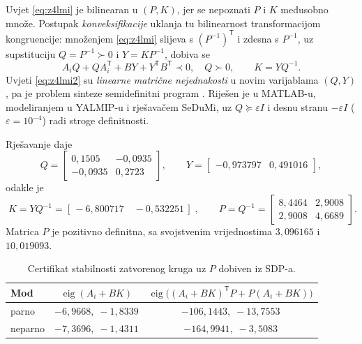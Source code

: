 Uvjet \eqref{eq:z4lmi} je bilinearan u $(P,K)$, jer se nepoznati $P$ i $K$
međusobno množe. Postupak \emph{konveksifikacije} \cite[str.~32]{jokic_ljapunov}
uklanja tu bilinearnost transformacijom kongruencije: množenjem
\eqref{eq:z4lmi} slijeva s $(P^{-1})^{\mathsf T}$ i zdesna s $P^{-1}$, uz
supstituciju $Q = P^{-1} \succ 0$ i $Y = KP^{-1}$, dobiva se
\begin{equation}
  A_iQ + QA_i^{\mathsf T} + BY + Y^{\mathsf T}B^{\mathsf T} \prec 0, \quad Q \succ 0,
  \qquad K = YQ^{-1} .
  \label{eq:z4lmi2}
\end{equation}
Uvjeti \eqref{eq:z4lmi2} su \emph{linearne matrične nejednakosti} u novim
varijablama $(Q,Y)$, pa je problem sinteze semidefinitni program
\cite[str.~23]{jokic_qcpsdp}. Riješen je u MATLAB-u, modeliranjem u YALMIP-u i
rješavačem SeDuMi, uz $Q \succeq \varepsilon I$ i desnu stranu $-\varepsilon I$
($\varepsilon = 10^{-4}$) radi stroge definitnosti.

Rješavanje daje
\begin{equation}
  Q = \begin{bmatrix} 0{,}1505 & -0{,}0935 \\ -0{,}0935 & 0{,}2723 \end{bmatrix}, \qquad
  Y = \begin{bmatrix} -0{,}973797 & 0{,}491016 \end{bmatrix},
\end{equation}
odakle je
\begin{equation}
  \boxed{\;K = YQ^{-1} = [\,-6{,}800717 \quad -0{,}532251\,]\;}, \qquad
  P = Q^{-1} = \begin{bmatrix} 8{,}4464 & 2{,}9008 \\ 2{,}9008 & 4{,}6689 \end{bmatrix}.
\end{equation}
Matrica $P$ je pozitivno definitna, sa svojstvenim vrijednostima $3{,}096165$ i
$10{,}019093$.

\begin{table}[htbp]
  \centering
  \caption{Certifikat stabilnosti zatvorenog kruga uz $P$ dobiven iz SDP-a.}
  \label{tab:z4}
  \begin{tabular}{lcc}
    \hline
    Mod & $\operatorname{eig}(A_i + BK)$ & $\operatorname{eig}\!\big((A_i+BK)^{\mathsf T}P + P(A_i+BK)\big)$ \\
    \hline
    parno    & $-6{,}9668,\; -1{,}8339$ & $-106{,}1443,\; -13{,}7553$ \\
    neparno  & $-7{,}3696,\; -1{,}4311$ & $-164{,}9941,\; -3{,}5083$ \\
    \hline
  \end{tabular}
\end{table}

